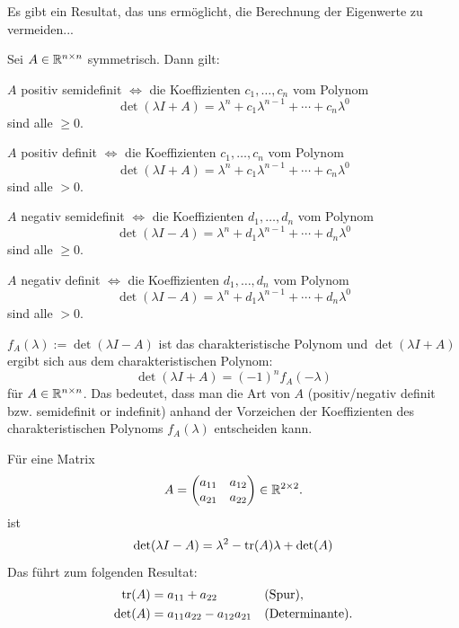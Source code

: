 \begin{bem}
	Es gibt ein Resultat, das uns ermöglicht, die Berechnung der Eigenwerte zu vermeiden...
\end{bem}

\begin{thm} 
	Sei $A \in \mathbb{R}^{n \times n}$ symmetrisch. Dann gilt: 
	\begin{enuma}
	\item $A$ positiv semidefinit $\Leftrightarrow$ die Koeffizienten $c_1,\ldots,c_n$ vom Polynom  
	\[
		\det(\lambda I + A) = \lambda^n + c_1 \lambda^{n-1} + \cdots + c_n \lambda^0
	\] sind alle $\ge 0$.  
	\item $A$ positiv definit $\Leftrightarrow$ die Koeffizienten $c_1,\ldots,c_n$ vom Polynom  
	\[
	\det(\lambda I + A) = \lambda^n + c_1 \lambda^{n-1} + \cdots + c_n \lambda^0
	\] sind alle $> 0$.  
	\item $A$ negativ semidefinit $\Leftrightarrow$ die Koeffizienten $d_1,\ldots,d_n$ vom Polynom  
\[
\det(\lambda I - A) = \lambda^n + d_1 \lambda^{n-1} + \cdots + d_n \lambda^0
\] sind alle $\ge 0$.  
\item $A$ negativ definit $\Leftrightarrow$ die Koeffizienten $d_1,\ldots,d_n$ vom Polynom  
\[
\det(\lambda I - A) = \lambda^n + d_1 \lambda^{n-1} + \cdots + d_n \lambda^0
\] sind alle $> 0$.  
\end{enuma} 
\end{thm} 

\begin{bem}
	$f_A(\lambda) := \det(\lambda I - A)$ ist das charakteristische Polynom und $\det(\lambda I + A)$ ergibt sich aus dem charakteristischen Polynom: 
	\[
		\det(\lambda I + A) = (-1)^n f_A( - \lambda)
	\]
	für $A \in \mathbb{R}^{n \times n}$. Das bedeutet, dass man die Art von $A$ (positiv/negativ definit bzw. semidefinit or indefinit) anhand der Vorzeichen der  Koeffizienten des charakteristischen Polynoms $f_A(\lambda)$ entscheiden kann. 
\end{bem} 

\begin{bem} 
	Für eine Matrix 
	\[
		A = \begin{pmatrix} a_{11} & a_{12} \\ a_{21} & a_{22} \end{pmatrix} \in \mathbb{R}^{2 \times 2}.
	\]
	ist 
	\[
		\det(\lambda I - A) = \lambda^2 - \operatorname{tr}(A) \lambda + \det(A)
	\]
	Das führt zum folgenden Resultat: 
	\begin{align*}
		\operatorname{tr}(A) & = a_{11} + a_{22}  & & \text{(Spur)},
	\\	\det(A) & = a_{11} a_{22} - a_{12} a_{21} & & \text{(Determinante)}.
	\end{align*}
\end{bem} 


